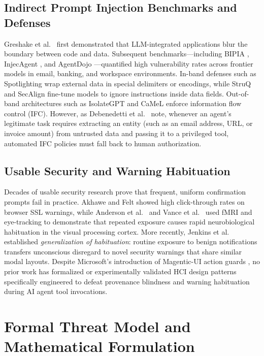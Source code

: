 \documentclass[10pt,twocolumn,letterpaper]{article}
\begin{document}
\subsection{Indirect Prompt Injection Benchmarks and Defenses}
Greshake et al.\ \cite{greshake2023not} first demonstrated that LLM-integrated applications blur the boundary between code and data. Subsequent benchmarks---including BIPIA \cite{yi2023bipia}, InjecAgent \cite{zhan2024injecagent}, and AgentDojo \cite{debenedetti2024agentdojo}---quantified high vulnerability rates across frontier models in email, banking, and workspace environments. In-band defenses such as Spotlighting \cite{hines2024spotlighting} wrap external data in special delimiters or encodings, while StruQ \cite{chen2024struq} and SecAlign \cite{chen2025secalign} fine-tune models to ignore instructions inside data fields. Out-of-band architectures such as IsolateGPT \cite{wu2025isolategpt} and CaMeL \cite{debenedetti2025camel} enforce information flow control (IFC). However, as Debenedetti et al.\ \cite{debenedetti2025camel} note, whenever an agent's legitimate task requires extracting an entity (such as an email address, URL, or invoice amount) from untrusted data and passing it to a privileged tool, automated IFC policies must fall back to human authorization.

\subsection{Usable Security and Warning Habituation}
Decades of usable security research prove that frequent, uniform confirmation prompts fail in practice. Akhawe and Felt \cite{akhawe2013alice} showed high click-through rates on browser SSL warnings, while Anderson et al.\ \cite{anderson2016polymorphic} and Vance et al.\ \cite{vance2018habituation} used fMRI and eye-tracking to demonstrate that repeated exposure causes rapid neurobiological habituation in the visual processing cortex. More recently, Jenkins et al.\ \cite{jenkins2025fog} established \emph{generalization of habituation}: routine exposure to benign notifications transfers unconscious disregard to novel security warnings that share similar modal layouts. Despite Microsoft's introduction of Magentic-UI action guards \cite{magenticui2025}, no prior work has formalized or experimentally validated HCI design patterns specifically engineered to defeat provenance blindness and warning habituation during AI agent tool invocations.

\section{Formal Threat Model and Mathematical Formulation}
\end{document}
